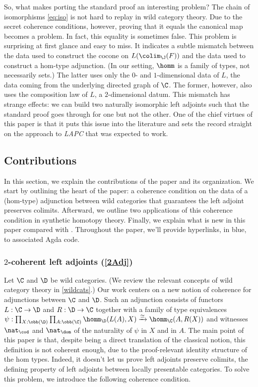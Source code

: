 So, what makes porting the standard proof an interesting problem? The chain of isomorphisms \eqref{eq:iso} is not hard to replay in wild category theory. Due to the secret coherence conditions, however, proving that it equals the canonical map becomes a problem. In fact, this equality is sometimes false. This problem is surprising at first glance and easy to miss. It indicates a subtle mismatch between the data used to construct the cocone on $L(\colim_{\J}(F))$ and the data used to construct a hom-type adjunction. (In our setting, $\homm$ is a family of types, not necessarily sets.) The latter uses only the $0$- and $1$-dimensional data of $L$, the data coming from the underlying directed graph of $\C$. The former, however, also uses the composition law of $L$, a $2$-dimensional datum. This mismatch has strange effects: we can build two naturally isomorphic left adjoints such that the standard proof goes through for one but not the other. One of the chief virtues of this paper is that it puts this issue into the literature and sets the record straight on the approach to \emph{LAPC} that was expected to work.

\subsection{Contributions}

In this section, we explain the contributions of the paper and its organization. We start by outlining the heart of the paper: a coherence condition on the data of a (hom-type) adjunction between wild categories that guarantees the left adjoint preserves colimits. Afterward, we outline two applications of this coherence condition in synthetic homotopy theory. Finally, we explain what is new in this paper compared with \cite{lapccsl}. Throughout the paper, we'll provide hyperlinks, in blue, to associated Agda code. 

\subsubsection{$2$-coherent left adjoints (\autoref{2Adj})}

Let $\C$ and $\D$ be wild categories. (We review the relevant concepts of wild category theory in \cref{wildcats}.) Our work centers on a new notion of coherence for adjunctions between $\C$ and $\D$.  Such an adjunction consists of functors $L : \C \to \D$ and $R : \D \to \C$ together with
a family of type equivalences $\psi : \prod_{X : \obb(\D)}\prod_{ A : \obb(\C)}\homm_{\D}(L(A), X) \xrightarrow{\simeq} \homm_{\C}(A,R(X))$ and witnesses $\nat_{\cod}$ and $\nat_{\dom}$ of the naturality of $\psi$ in $X$ and in $A$. The main point of this paper is that, despite being a direct translation of the classical notion, this definition is not coherent enough, due to the proof-relevant identity structure of the hom types. Indeed, it doesn't let us prove left adjoints preserve colimits, the defining property of left adjoints between locally presentable categories.
To solve this problem, we introduce the following coherence condition.

